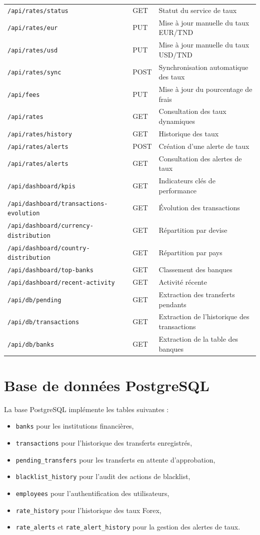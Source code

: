 \documentclass[a4paper,12pt]{report}
\begin{document}
\begin{longtable}{p{4cm}p{4cm}p{7cm}}
\texttt{/api/rates/status} & GET & Statut du service de taux \\
\texttt{/api/rates/eur} & PUT & Mise à jour manuelle du taux EUR/TND \\
\texttt{/api/rates/usd} & PUT & Mise à jour manuelle du taux USD/TND \\
\texttt{/api/rates/sync} & POST & Synchronisation automatique des taux \\
\texttt{/api/fees} & PUT & Mise à jour du pourcentage de frais \\
\texttt{/api/rates} & GET & Consultation des taux dynamiques \\
\texttt{/api/rates/history} & GET & Historique des taux \\
\texttt{/api/rates/alerts} & POST & Création d'une alerte de taux \\
\texttt{/api/rates/alerts} & GET & Consultation des alertes de taux \\
\texttt{/api/dashboard/kpis} & GET & Indicateurs clés de performance \\
\texttt{/api/dashboard/transactions-evolution} & GET & Évolution des transactions \\
\texttt{/api/dashboard/currency-distribution} & GET & Répartition par devise \\
\texttt{/api/dashboard/country-distribution} & GET & Répartition par pays \\
\texttt{/api/dashboard/top-banks} & GET & Classement des banques \\
\texttt{/api/dashboard/recent-activity} & GET & Activité récente \\
\texttt{/api/db/pending} & GET & Extraction des transferts pendants \\
\texttt{/api/db/transactions} & GET & Extraction de l'historique des transactions \\
\texttt{/api/db/banks} & GET & Extraction de la table des banques \\
\end{longtable}

\section{Base de données PostgreSQL}
La base PostgreSQL implémente les tables suivantes :
\begin{itemize}[leftmargin=*,nosep]
  \item \texttt{banks} pour les institutions financières,
  \item \texttt{transactions} pour l'historique des transferts enregistrés,
  \item \texttt{pending\_transfers} pour les transferts en attente d'approbation,
  \item \texttt{blacklist\_history} pour l'audit des actions de blacklist,
  \item \texttt{employees} pour l'authentification des utilisateurs,
  \item \texttt{rate\_history} pour l'historique des taux Forex,
  \item \texttt{rate\_alerts} et \texttt{rate\_alert\_history} pour la gestion des alertes de taux.
\end{itemize}
\end{document}
